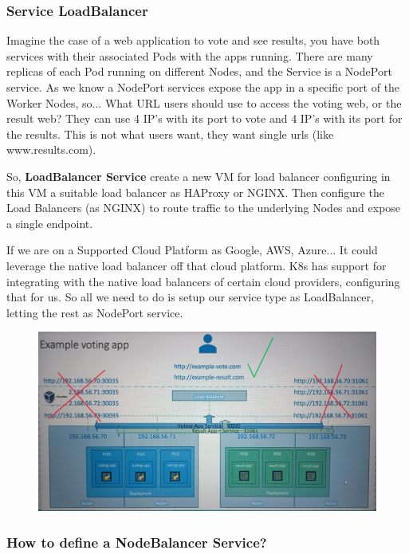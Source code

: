 \documentclass{article}
\begin{document}
\subsubsection{Service LoadBalancer}

Imagine the case of a web application to vote and see results, you have both services with their associated Pods with the apps running. There are many replicas of each Pod running on different Nodes, and the Service is a NodePort service. As we know a NodePort services expose the app in a specific port of the Worker Nodes, so... What URL users should use to access the voting web, or the result web? They can use 4 IP's with its port to vote and 4 IP's with its port for the results. This is not what users want, they want single urls (like www.results.com).

So, \textbf{LoadBalancer Service} create a new VM for load balancer configuring in this VM a suitable load balancer as HAProxy or NGINX. Then configure the Load Balancers (as NGINX) to route traffic to the underlying Nodes and expose a single endpoint.

If we are on a Supported Cloud Platform as Google, AWS, Azure... It could leverage the native load balancer off that cloud platform. K8s has support for integrating with the native load balancers of certain cloud providers, configuring that for us. So all we need to do is setup our service type as LoadBalancer, letting the rest as NodePort service.

\begin{figure}[H]
    \centering
    \includegraphics[width=\textwidth]{pictures/services5.jpeg}
\end{figure}

\subsubsection{How to define a NodeBalancer Service?}
\end{document}
